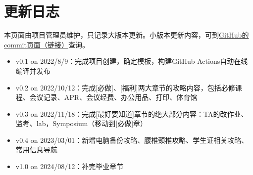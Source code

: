 \chapter{更新日志}

本页面由项目管理员维护，只记录大版本更新。小版本更新内容，可到\href{https://github.com/kaiwu-astro/xp_pgrs_unofficial_guide/commits/main}{GitHub的commit页面（链接）}查询。

\begin{itemize}
    \item v0.1 on 2022/8/9：完成项目创建，确定模板，构建GitHub Actions自动在线编译并发布
    \item v0.2 on 2022/10/12：完成[必做]、[福利]两大章节的攻略内容，包括必修课程、会议记录、APR、会议经费、办公用品、打印、体育馆
    \item v0.3 on 2022/11/18：完成[最好要知道]章节的绝大部分内容：TA的改作业、监考、lab，Symposium（移动到[必做]章）
    \item v0.4 on 2023/03/01：新增电脑备份攻略、腰椎颈椎攻略、学生证相关攻略、常用信息导航
    \item v1.0 on 2024/08/12：补完毕业章节
\end{itemize}



